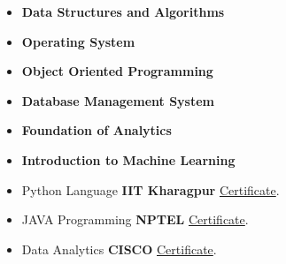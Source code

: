 \smallskip
\begin{itemize}
\item \textbf{Data Structures and Algorithms}
\item \textbf{Operating System}
\item \textbf{Object Oriented Programming}
\item \textbf{Database Management System}
\item \textbf{Foundation of Analytics}
\item \textbf{Introduction to Machine Learning}
\smallskip
\end{itemize}

\smallskip
\begin{itemize} 
\item Python Language \textbf{IIT Kharagpur} {\href{https://drive.google.com/file/d/1mD33YSmfJHSfFdwR_phiA6Iaw-VgEdft/view?usp=sharing}{Certificate}}.
\item JAVA Programming \textbf{NPTEL} {\href{https://drive.google.com/file/d/1pwcaHKLyUoVAWohym2Xpn3FwTI6iC7Un/view?usp=sharing}{Certificate}}.
\item Data Analytics \textbf{CISCO} {\href{https://drive.google.com/file/d/16WK-eIIM35ZnzWGQ9mx5ghMUokoFYSUw/view?usp=sharing}{Certificate}}.
\smallskip
\\
\end{itemize}


\smallskip
\begin{itemize} 

\smallskip
\\
\end{itemize}
\cvproject{}
 


